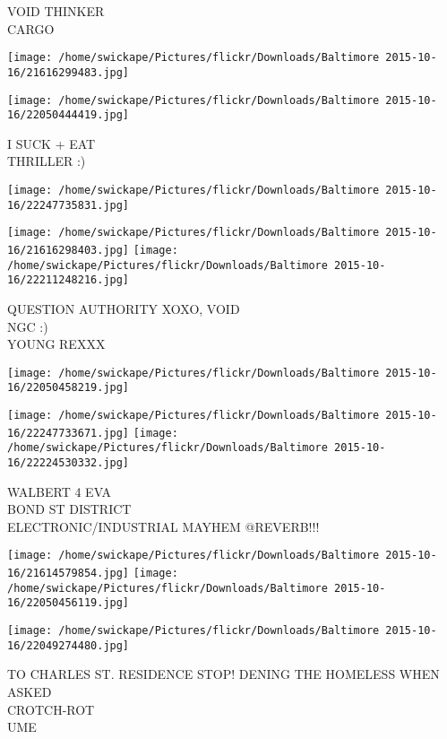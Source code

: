 \documentclass[10pt,letterpaper]{article}
\begin{document}
VOID THINKER\\
CARGO
\pagebreak

\texttt{[image: /home/swickape/Pictures/flickr/Downloads/Baltimore 2015-10-16/21616299483.jpg]}

\vspace{0.25in}
\texttt{[image: /home/swickape/Pictures/flickr/Downloads/Baltimore 2015-10-16/22050444419.jpg]}

I SUCK + EAT\\
THRILLER :)
\pagebreak

\texttt{[image: /home/swickape/Pictures/flickr/Downloads/Baltimore 2015-10-16/22247735831.jpg]}

\vspace{0.25in}
\texttt{[image: /home/swickape/Pictures/flickr/Downloads/Baltimore 2015-10-16/21616298403.jpg]}
\texttt{[image: /home/swickape/Pictures/flickr/Downloads/Baltimore 2015-10-16/22211248216.jpg]}

QUESTION AUTHORITY XOXO, VOID\\
NGC :)\\
YOUNG REXXX
\pagebreak

\texttt{[image: /home/swickape/Pictures/flickr/Downloads/Baltimore 2015-10-16/22050458219.jpg]}

\vspace{0.25in}
\texttt{[image: /home/swickape/Pictures/flickr/Downloads/Baltimore 2015-10-16/22247733671.jpg]}
\texttt{[image: /home/swickape/Pictures/flickr/Downloads/Baltimore 2015-10-16/22224530332.jpg]}

WALBERT 4 EVA\\
BOND ST DISTRICT\\
ELECTRONIC/INDUSTRIAL MAYHEM @REVERB!!!
\pagebreak

\texttt{[image: /home/swickape/Pictures/flickr/Downloads/Baltimore 2015-10-16/21614579854.jpg]}
\texttt{[image: /home/swickape/Pictures/flickr/Downloads/Baltimore 2015-10-16/22050456119.jpg]}

\vspace{0.25in}
\texttt{[image: /home/swickape/Pictures/flickr/Downloads/Baltimore 2015-10-16/22049274480.jpg]}

TO CHARLES ST. RESIDENCE STOP! DENING THE HOMELESS WHEN ASKED\\
CROTCH{-}ROT\\
UME
\pagebreak
\end{document}
